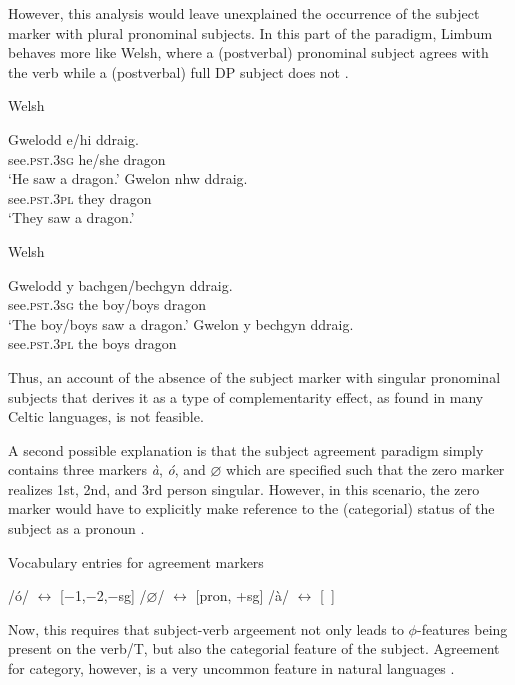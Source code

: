 \documentclass[output=paper]{langscibook}
\begin{document}
However, this analysis would leave unexplained the occurrence of the
subject marker with plural pronominal subjects. In this part of the
paradigm, Limbum behaves more like Welsh, where a (postverbal)
pronominal subject agrees with the verb  while a (postverbal)
full DP subject does not .

\ea Welsh \citep[][227]{borsley09}\label{ex:johanneshein:welshPRON}
\begin{xlist}
\ex 
\gll Gwelodd e/hi ddraig.\\
see.\textsc{pst.3sg} he/she dragon\\
\glt `He saw a dragon.'
\ex 
\gll Gwelon nhw ddraig.\\
see.\textsc{pst.3pl} they dragon\\
\glt `They saw a dragon.'
\end{xlist}
\ex Welsh \citep[][227]{borsley09}\label{ex:johanneshein:welshNP}
\begin{xlist}
\ex 
\gll Gwelodd y bachgen/bechgyn ddraig.\\
see.\textsc{pst.3sg} the boy/boys dragon\\
\glt `The boy/boys saw a dragon.'
\ex
\gll *Gwelon y bechgyn ddraig.\\
see.\textsc{pst.3pl} the boys dragon\\
\end{xlist}
\z
Thus, an account of the absence of the subject marker with singular
pronominal subjects that derives it as a type of complementarity
effect, as found in many Celtic languages, is not feasible.

A second possible explanation is that the subject agreement paradigm simply
contains three markers \textit{à}, \textit{ó}, and $\varnothing$
which are specified such that the zero marker realizes 1st, 2nd, and
3rd person singular. However, in this scenario, the zero marker would
have to explicitly make reference to the (categorial) status of the
subject as a pronoun .

\ea Vocabulary entries for agreement markers\label{ex:johanneshein:VEs}
\begin{xlist}
\ex /ó/ $\leftrightarrow$ [$-$1,$-$2,$-$sg]
\ex /$\varnothing$/ $\leftrightarrow$ [pron, +sg]
\ex /à/ $\leftrightarrow$ [~]
\end{xlist}
\z
Now, this requires that subject-verb argeement not only leads to
$\phi$-features being present on the verb/T, but also the categorial
feature of the subject. Agreement for category, however, is a
very uncommon feature in natural languages \citep[cf.][]{weisser19}.
\end{document}
